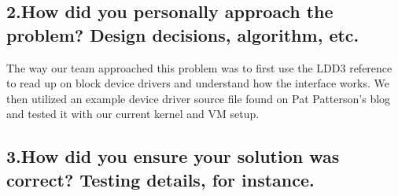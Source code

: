 \documentclass[onecolumn, draftclsnofoot,10pt, compsoc]{IEEEtran}
\begin{document}
	\subsection*{2.How did you personally approach the problem? Design decisions, algorithm, etc.}
	The way our team approached this problem was to first use the LDD3 reference to read up on block device drivers and understand how the interface works. We then utilized an example device driver source file found on Pat Patterson's blog and tested it with our current kernel and VM setup.

	\subsection*{3.How did you ensure your solution was correct? Testing details, for instance.}
\end{document}
